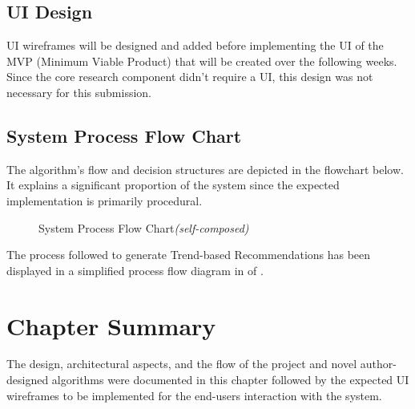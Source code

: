 \subsection{UI Design}
UI wireframes will be designed and added before implementing the UI of the MVP (Minimum Viable Product) that will be created over the following weeks. Since the core research component didn't require a UI, this design was not necessary for this submission.

\subsection{System Process Flow Chart}
The algorithm's flow and decision structures are depicted in the flowchart below. It explains a significant proportion of the system since the expected implementation is primarily procedural.

\begin{figure}[h!]
\centering
\setlength{\fboxsep}{10pt}%
\setlength{\fboxrule}{0.5pt}%
\caption{System Process Flow Chart\textit{(self-composed)}}
\label{fig:system-process-flowchart}
\end{figure}



The process followed to generate Trend-based Recommendations has been displayed in a simplified process flow diagram in \textit{} of \textit{}.

\section{Chapter Summary}
The design, architectural aspects, and the flow of the project and novel author-designed algorithms were documented in this chapter followed by the expected UI wireframes to be implemented for the end-users interaction with the system.
